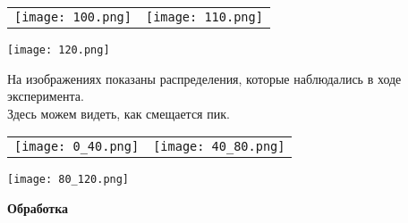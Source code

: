 \documentclass[12pt]{article}
\begin{document}
\begin{center}
    \begin{tabular}{cc}
      \texttt{[image: 100.png]} & \texttt{[image: 110.png]} \\
    \end{tabular}
\end{center}
\begin{center}
    \texttt{[image: 120.png]}
\end{center}
На изображениях показаны распределения, которые наблюдались в ходе эксперимента.
\\
Здесь можем видеть, как смещается пик.
\begin{center}
    \begin{tabular}{cc}
      \texttt{[image: 0\_40.png]} & \texttt{[image: 40\_80.png]} \\
    \end{tabular}
\end{center}
\begin{center}
    \texttt{[image: 80\_120.png]}
\end{center}
\begin{center}
    \textbf{Обработка}
\end{center}
\end{document}

